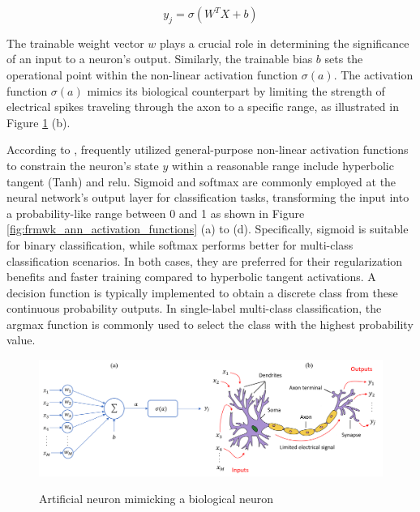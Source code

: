 \begin{equation}
    \label{eq:ann_activation_outpu}
    y_j = \sigma  \left( W^TX +b \right)
\end{equation}

The trainable weight vector $w$ plays a crucial role in determining the significance of an input to a neuron's output. Similarly, the trainable bias $b$ sets the operational point within the non-linear activation function $\sigma(a)$. The activation function $\sigma(a)$ mimics its biological counterpart by limiting the strength of electrical spikes traveling through the axon to a specific range, as illustrated in Figure \ref{fig:frmwk_ann_artificial_neuron} (b).

According to \textcite{Bishop2023}, frequently utilized general-purpose non-linear activation functions to constrain the neuron's state $y$ within a reasonable range include hyperbolic tangent (Tanh) and \gls{relu}. Sigmoid and softmax are commonly employed at the neural network's output layer for classification tasks, transforming the input into a probability-like range between 0 and 1 as shown in Figure \ref{fig:frmwk_ann_activation_functions} (a) to (d). Specifically, sigmoid is suitable for binary classification, while softmax performs better for multi-class classification scenarios. In both cases, they are preferred for their regularization benefits and faster training compared to hyperbolic tangent activations. A decision function is typically implemented to obtain a discrete class from these continuous probability outputs. In single-label multi-class classification, the argmax function is commonly used to select the class with the highest probability value. 

\begin{figure}[htbp]
    \raggedright
        \caption{Artificial neuron mimicking a biological neuron}
        \includegraphics[width=1\textwidth]{resources/images/030-theoretical_framework/Framework_ann_neuron.png}
        \label{fig:frmwk_ann_artificial_neuron}
\end{figure}

